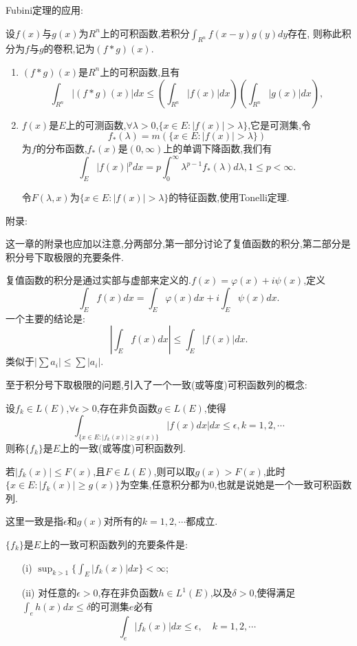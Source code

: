 \documentclass[12pt,a4paper,openany]{book}
\begin{document}
Fubini定理的应用:

设$f(x)$与$g(x)$为$R^n$上的可积函数,若积分$\int_{R^n}{f(x-y)g(y)dy}$存在, 则称此积分为$f$与$g$的卷积,记为$(f*g)(x)$.
\begin{enumerate}
\item $(f*g)(x)$是$R^n$上的可积函数,且有
\[
\int_{R^n}{|(f*g)(x)|dx} \le (\int_{R^n}{|f(x)|dx})(\int_{R^n}{|g(x)|dx}),
\]

\item $f(x)$是$E$上的可测函数,$\forall \lambda > 0$,$\{x \in E: |f(x)| > \lambda\}$,它是可测集,令
\[
f_*(\lambda)=m(\{x \in E: |f(x)| > \lambda\})
\]
为$f$的分布函数,$f_*(x)$是$(0, \infty)$上的单调下降函数,我们有
\[
\int_{E}{|f(x)|^pdx} = p\int_{0}^{\infty}{\lambda^{p-1}f_*(\lambda)d\lambda}, 1 \le p < \infty.
\]

令$F(\lambda, x)$为$\{x \in E: |f(x)| > \lambda\}$的特征函数,使用Tonelli定理.
\end{enumerate}

附录:

这一章的附录也应加以注意,分两部分,第一部分讨论了复值函数的积分,第二部分是积分号下取极限的充要条件.

复值函数的积分是通过实部与虚部来定义的.$f(x) = \varphi(x) + i\psi(x)$,定义
\[
\int_{E}{f(x)dx} = \int_{E}{\varphi(x)dx} + i\int_{E}{\psi(x)dx}.
\]
一个主要的结论是:
\[
|\int_{E}{f(x)dx}| \le \int_{E}{|f(x)|dx}.
\]
类似于$|\sum{a_i}| \le \sum{|a_i|}$.

至于积分号下取极限的问题,引入了一个一致(或等度)可积函数列的概念:

设$f_k \in L(E)$,$\forall \epsilon>0$,存在非负函数$g \in L(E)$,使得
\[
\int_{\{x\in E:|f_k(x)|\ge g(x)\}}{|f(x)dx|dx} \le \epsilon,k=1,2,\cdots
\]
则称$\{f_k\}$是$E$上的一致(或等度)可积函数列.

若$|f_k(x)| \le F(x)$,且$F \in L(E)$,则可以取$g(x)>F(x)$,此时$\{x\in E: |f_k(x)| \ge g(x)\}$为空集,任意积分都为0,也就是说她是一个一致可积函数列.

这里一致是指$\epsilon$和$g(x)$对所有的$k=1,2,\cdots$都成立.

$\{f_k\}$是$E$上的一致可积函数列的充要条件是:
\begin{enumerate}
\item[(i)] $\sup_{k>1}{\{\int_{E}{|f_k(x)|dx}\}} < \infty$;
\item[(ii)] 对任意的$\epsilon>0$,存在非负函数$h \in L^1(E)$,以及$\delta>0$,使得满足$\int_{e}{h(x)dx}\le \delta$的可测集$e$必有
\[
\int_{e}{|f_k(x)|dx} \le \epsilon,\quad k=1,2,\cdots
\]
\end{enumerate}
\end{document}
